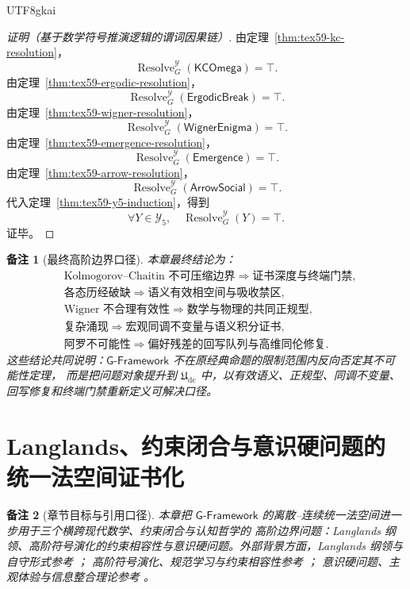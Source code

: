 \documentclass[12pt]{article}
\newtheorem{remark}{备注}[section]
\newcommand{\GFramework}{\textsf{G-Framework}}
\newcommand{\Udc}{\mathfrak{U}_{\mathrm{dc}}}
\DeclareMathOperator{\Resolve}{Resolve}
\begin{document}
\begin{CJK*}{UTF8}{gkai}
\begin{proof}[证明（基于数学符号推演逻辑的谓词因果链）]
由定理~\ref{thm:tex59-kc-resolution}，
\[
  \Resolve_G^{\mathcal Y}(\mathsf{KCOmega})=\top.
\]
由定理~\ref{thm:tex59-ergodic-resolution}，
\[
  \Resolve_G^{\mathcal Y}(\mathsf{ErgodicBreak})=\top.
\]
由定理~\ref{thm:tex59-wigner-resolution}，
\[
  \Resolve_G^{\mathcal Y}(\mathsf{WignerEnigma})=\top.
\]
由定理~\ref{thm:tex59-emergence-resolution}，
\[
  \Resolve_G^{\mathcal Y}(\mathsf{Emergence})=\top.
\]
由定理~\ref{thm:tex59-arrow-resolution}，
\[
  \Resolve_G^{\mathcal Y}(\mathsf{ArrowSocial})=\top.
\]
代入定理~\ref{thm:tex59-y5-induction}，得到
\[
  \forall Y\in\mathcal Y_5,\quad
  \Resolve_G^{\mathcal Y}(Y)=\top.
\]
证毕。
\end{proof}

\begin{remark}[最终高阶边界口径]
本章最终结论为：
\[
  \boxed{
  \begin{aligned}
  &\text{Kolmogorov--Chaitin 不可压缩边界}
  \Longrightarrow
  \text{证书深度与终端门禁},\\
  &\text{各态历经破缺}
  \Longrightarrow
  \text{语义有效相空间与吸收禁区},\\
  &\text{Wigner 不合理有效性}
  \Longrightarrow
  \text{数学与物理的共同正规型},\\
  &\text{复杂涌现}
  \Longrightarrow
  \text{宏观同调不变量与语义积分证书},\\
  &\text{阿罗不可能性}
  \Longrightarrow
  \text{偏好残差的回写队列与高维同伦修复}.
  \end{aligned}
  }
\]
这些结论共同说明：\(\GFramework{}\) 不在原经典命题的限制范围内反向否定其不可能性定理，
而是把问题对象提升到 \(\Udc\) 中，以有效语义、正规型、同调不变量、回写修复和终端门禁重新定义可解决口径。
\end{remark}

\section{Langlands、约束闭合与意识硬问题的统一法空间证书化}
\label{sec:tex59-langlands-conformance-consciousness}

\begin{remark}[章节目标与引用口径]
本章把 \(\GFramework{}\) 的离散--连续统一法空间进一步用于三个横跨现代数学、约束闭合与认知哲学的
高阶边界问题：Langlands 纲领、高阶符号演化的约束相容性与意识硬问题。外部背景方面，Langlands 纲领与自守形式参考
\cite{Langlands1970Problems,Gelbart1984AutomorphicForms,Frenkel2007Langlands,Wiles1995Modular}；
高阶符号演化、规范学习与约束相容性参考 \cite{Bostrom2014Superintelligence,Russell2019HumanCompatible}；
意识硬问题、主观体验与信息整合理论参考
\cite{Nagel1974WhatIsItLike,Chalmers1995Facing,Tononi2004IIT}。


\end{remark}
\end{CJK*}
\end{document}
